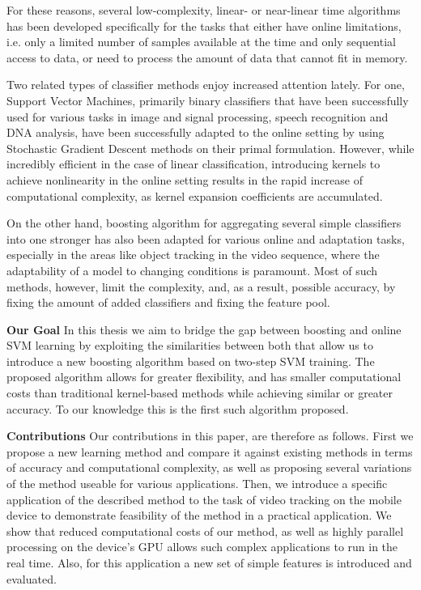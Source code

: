 For these reasons, several low-complexity, linear- or near-linear time algorithms has been developed specifically for the tasks that either have online limitations, i.e. only a limited number of samples available at the time and only sequential access to data, or need to process the amount of data that cannot fit in memory.

Two related types of classifier methods enjoy increased attention lately. For one, Support Vector Machines, primarily binary classifiers that have been successfully used for various tasks in image and signal processing, speech recognition and DNA analysis, have been successfully adapted to the online setting by using Stochastic Gradient Descent methods on their primal formulation. However, while incredibly efficient in the case of linear classification, introducing kernels to achieve nonlinearity in the online setting results in the  rapid increase of computational complexity, as kernel expansion coefficients are accumulated. 

On the other hand, boosting algorithm for aggregating several simple classifiers into one stronger has also been adapted for various online and adaptation tasks, especially in the areas like object tracking in the video sequence, where the adaptability of a model to changing conditions is paramount. Most of such methods, however, limit the complexity, and, as a result, possible accuracy, by fixing the amount of added classifiers and fixing the feature pool. 

{\bf Our Goal} In this thesis we aim to bridge the gap between boosting and online SVM learning by exploiting the similarities between both that allow us to introduce a new boosting algorithm based on two-step SVM training. The proposed algorithm allows for greater flexibility, and has smaller computational costs than traditional kernel-based methods while achieving similar or greater accuracy. To our knowledge this is the first such algorithm proposed. 

{\bf Contributions} Our contributions in this paper, are therefore as follows. First we propose a new learning method and compare it against existing methods in terms of accuracy and computational complexity, as well as proposing several variations of the method useable for various applications. Then, we introduce a specific application of the described method to the task of video tracking on the mobile device to demonstrate feasibility of the method in a practical application. We show that reduced computational costs of our method, as well as highly parallel processing on the device's GPU allows such complex applications to run in the real time. Also, for this application a new set of simple features is introduced and evaluated.

